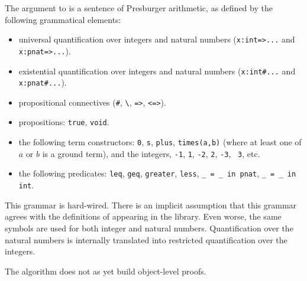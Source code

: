 The argument to  is a sentence of Presburger arithmetic,
as defined by the following grammatical elements:

\begin{itemize}
\item universal quantification over integers and natural numbers ({\tt x:int=>...}
and {\tt x:pnat=>...}).
\item existential quantification over integers and natural numbers ({\tt x:int\#...}
and {\tt x:pnat\#...}).
\item propositional connectives ({\tt \#}, \verb|\|, {\tt =>}, {\tt <=>}).
\item propositions: {\tt {true}}, {\tt void}.
\item the following term constructors: {\tt 0}, {\tt s}, {\tt plus},
{\tt times(a,b)} (where at least one of $a$ or $b$ is a ground term),
and the integers, {\tt -1}, {\tt 1}, {\tt -2}, {\tt 2}, {\tt -3}, {\tt
3},  etc.
\item the following predicates: {\tt leq}, {\tt geq}, {\tt greater},
{\tt less}, {\tt \_ = \_ in pnat}, {\tt \_ = \_ in int}.
\end{itemize}
\notnice This grammar is hard-wired.  There is an implicit assumption
that this grammar agrees with the definitions of appearing in the
\clam library.  Even worse, the same symbols are used for both integer
and natural numbers.  Quantification over the natural numbers is
internally translated into restricted quantification over the integers.

The algorithm does not as yet build object-level proofs.

